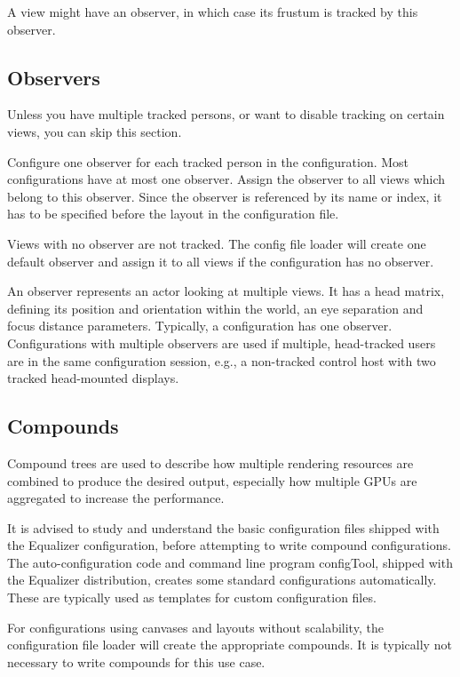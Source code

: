 \documentclass[10pt,a4]{scrartcl}
\begin{document}
A view might have an observer, in which case its frustum is tracked by
this observer. 

\subsection{Observers}

Unless you have multiple tracked persons, or want to disable tracking on
certain views, you can skip this section.

Configure one \textsf{observer} for each tracked person in the
configuration. Most configurations have at most one observer. Assign the
observer to all views which belong to this observer. Since the observer
is referenced by its name or index, it has to be specified before the
layout in the configuration file.

Views with no observer are not tracked. The config file loader will
create one default observer and assign it to all views if the
configuration has no observer.

An observer represents an actor looking at multiple views. It has a head matrix,
defining its position and orientation within the world, an eye separation and
focus distance parameters. Typically, a configuration has one
observer. Configurations with multiple observers are used if multiple,
head-tracked users are in the same configuration session, e.g., a non-tracked
control host with two tracked head-mounted displays.

\subsection{\label{sCompounds}Compounds}

Compound trees are used to describe how multiple rendering resources are
combined to produce the desired output, especially how multiple GPUs are
aggregated to increase the performance.

It is advised to study and understand the basic configuration files shipped with
the Equalizer configuration, before attempting to write compound
configurations. The auto-configuration code and command line program
\textsf{configTool}, shipped with the Equalizer distribution, creates some
standard configurations automatically. These are typically used as templates for
custom configuration files.

For configurations using canvases and layouts without scalability, the
configuration file loader will create the appropriate compounds. It is
typically not necessary to write compounds for this use case.
\end{document}
